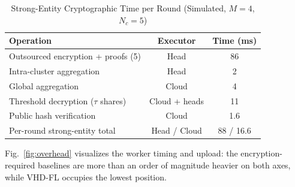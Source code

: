 \begin{table}[t]
\centering
\caption{Strong-Entity Cryptographic Time per Round (Simulated, $M=4$, $N_c=5$)}
\label{tab:strong-cost}
\footnotesize
\setlength{\tabcolsep}{4pt}
\renewcommand{\arraystretch}{1.15}
\begin{tabular}{@{}lcc@{}}
\toprule
Operation & Executor & Time (ms) \\
\midrule
Outsourced encryption + proofs (5) & Head & 86 \\
Intra-cluster aggregation & Head & 2 \\
Global aggregation & Cloud & 4 \\
Threshold decryption ($\tau$ shares) & Cloud + heads & 11 \\
Public hash verification & Cloud & 1.6 \\
\midrule
Per-round strong-entity total & Head / Cloud & 88 / 16.6 \\
\bottomrule
\end{tabular}
\end{table}

Fig.~\ref{fig:overhead} visualizes the worker timing and upload: the encryption-required baselines are more than an order of magnitude heavier on both axes, while \textsc{VHD-FL} occupies the lowest position.


